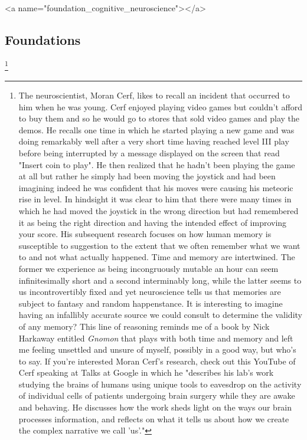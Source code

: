 
\rawhtml
<a name="foundation_cognitive_neuroscience"></a>
\endrawhtml
\subsection*{Foundations}


\footnote{%
%
  The neuroscientist, Moran Cerf, likes to recall an incident that occurred to him when he was young. Cerf enjoyed playing video games but couldn't afford to buy them and so he would go to stores that sold video games and play the demos. He recalls one time in which he started playing a new game and was doing remarkably well after a very short time having reached level III play before being interrupted by a message displayed on the screen that read "Insert coin to play". He then realized that he hadn't been playing the game at all but rather he simply had been moving the joystick and had been imagining \emdash{} indeed he was confident that \emdash{} his moves were causing his meteoric rise in level. In hindsight it was clear to him that there were many times in which he had moved the joystick in the wrong direction but had remembered it as being the right direction and having the intended effect of improving your score. His subsequent research focuses on how human memory is susceptible to suggestion to the extent that we often remember what we want to and not what actually happened. Time and memory are intertwined. The former we experience as being incongruously mutable \emdash{} an hour can seem infinitesimally short and a second interminably long, while the latter seems to us incontrovertibly fixed and yet neuroscience tells us that memories are subject to fantasy and random happenstance. It is interesting to imagine having an infallibly accurate source we could consult to determine the validity of any memory?  This line of reasoning reminds me of a book by Nick Harkaway entitled {\it{Gnomon}} that plays with both time and memory and left me feeling unsettled and unsure of myself, possibly in a good way, but who's to say. If you're interested Moran Cerf's research, check out this YouTube{} of Cerf speaking at Talks at Google in which he "describes his lab's work studying the brains of humans using unique tools to eavesdrop on the activity of individual cells of patients undergoing brain surgery while they are awake and behaving. He discusses how the work sheds light on the ways our brain processes information, and reflects on what it tells us about how we create the complex narrative we call 'us'."}

